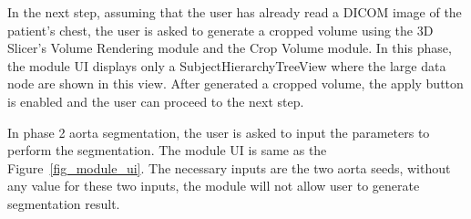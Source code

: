 In the next step, assuming that the user has already read a DICOM image of the patient's chest, the user is asked to generate a cropped volume using the 3D Slicer's Volume Rendering module and the Crop Volume module. In this phase, the module UI displays only a SubjectHierarchyTreeView where the large data node are shown in this view. After generated a cropped volume, the apply button is enabled and the user can proceed to the next step.

In phase 2 aorta segmentation, the user is asked to input the parameters to perform the segmentation. The module UI is same as the Figure~\ref{fig_module_ui}. The necessary inputs are the two aorta seeds, without any value for these two inputs, the module will not allow user to generate segmentation result.

%





%


